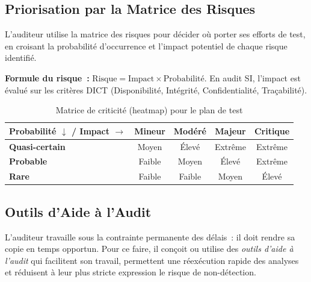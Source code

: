 \subsection{Priorisation par la Matrice des Risques}
\label{subsec:matrice-risques}

L'auditeur utilise la matrice des risques pour décider où porter ses efforts de test,
en croisant la probabilité d'occurrence et l'impact potentiel de chaque risque identifié.

\begin{boxdef}
\textbf{Formule du risque~:} $\text{Risque} = \text{Impact} \times \text{Probabilité}$.
En audit SI, l'impact est évalué sur les critères DICT (Disponibilité, Intégrité,
Confidentialité, Traçabilité).
\end{boxdef}

\begin{table}[h!]
\centering
\renewcommand{\arraystretch}{1.5}
\begin{tabular}{|l|c|c|c|c|}
    \hline
    \rowcolor{gray!20}
    \textbf{Probabilité $\downarrow$ / Impact $\rightarrow$} &
    \textbf{Mineur} & \textbf{Modéré} & \textbf{Majeur} & \textbf{Critique} \\ \hline
    \textbf{Quasi-certain} &
    \cellcolor{yellow!40}Moyen & \cellcolor{orange!40}Élevé &
    \cellcolor{red!60}Extrême & \cellcolor{red!60}Extrême \\ \hline
    \textbf{Probable} &
    \cellcolor{green!20}Faible & \cellcolor{yellow!40}Moyen &
    \cellcolor{orange!40}Élevé & \cellcolor{red!60}Extrême \\ \hline
    \textbf{Rare} &
    \cellcolor{green!20}Faible & \cellcolor{green!20}Faible &
    \cellcolor{yellow!40}Moyen & \cellcolor{orange!40}Élevé \\ \hline
\end{tabular}
\caption{Matrice de criticité (heatmap) pour le plan de test}
\end{table}

\subsection{Outils d'Aide à l'Audit}
\label{subsec:outils-audit}

L'auditeur travaille sous la contrainte permanente des délais~: il doit rendre sa
copie en temps opportun. Pour ce faire, il conçoit ou utilise des \emph{outils d'aide
à l'audit} qui facilitent son travail, permettent une réexécution rapide des analyses
et réduisent à leur plus stricte expression le risque de non-détection.

